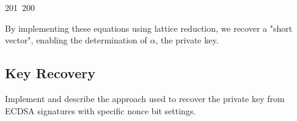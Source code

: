 201~200~\documentclass{article}
\begin{document}
	                                                                        	                                                                    	                                	                    	                    	                        	                        	                    	                                                                	                	                                                                    	                    							            By implementing these equations using lattice reduction, we recover a "short vector", enabling the determination of $\alpha$, the private key.


	                                                                        	                                                                    	                                	                    	                    	                        	                        	                    	                                                                	                	                                                                    	                    							            \subsection{Key Recovery}
	                                                                        	                                                                    	                                	                    	                    	                        	                        	                    	                                                                	                	                                                                    	                    							            Implement and describe the approach used to recover the private key from ECDSA signatures with specific nonce bit settings.
\end{document}
